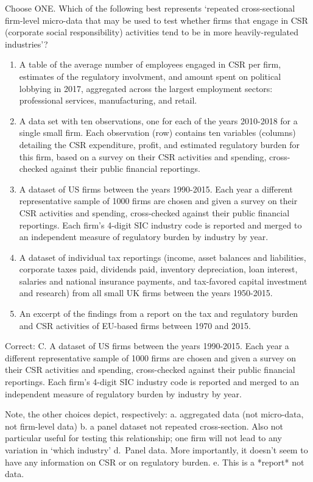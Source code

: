 \documentclass[]{article}
\begin{document}
Choose ONE. Which of the following best represents `repeated
cross-sectional firm-level micro-data that may be used to test whether
firms that engage in CSR (corporate social responsibility) activities
tend to be in more heavily-regulated industries'?

\begin{enumerate}
\def\labelenumi{\Alph{enumi}.}
\item
  A table of the average number of employees engaged in CSR per firm,
  estimates of the regulatory involvment, and amount spent on political
  lobbying in 2017, aggregated across the largest employment sectors:
  professional services, manufacturing, and retail.
\item
  A data set with ten observations, one for each of the years 2010-2018
  for a single small firm. Each observation (row) contains ten variables
  (columns) detailing the CSR expenditure, profit, and estimated
  regulatory burden for this firm, based on a survey on their CSR
  activities and spending, cross-checked against their public financial
  reportings.
\item
  A dataset of US firms between the years 1990-2015. Each year a
  different representative sample of 1000 firms are chosen and given a
  survey on their CSR activities and spending, cross-checked against
  their public financial reportings. Each firm's 4-digit SIC industry
  code is reported and merged to an independent measure of regulatory
  burden by industry by year.
\item
  A dataset of individual tax reportings (income, asset balances and
  liabilities, corporate taxes paid, dividends paid, inventory
  depreciation, loan interest, salaries and national insurance payments,
  and tax-favored capital investment and research) from all small UK
  firms between the years 1950-2015.
\item
  An excerpt of the findings from a report on the tax and regulatory
  burden and CSR activities of EU-based firms between 1970 and 2015.
\end{enumerate}

Correct: C. A dataset of US firms between the years 1990-2015. Each year
a different representative sample of 1000 firms are chosen and given a
survey on their CSR activities and spending, cross-checked against their
public financial reportings. Each firm's 4-digit SIC industry code is
reported and merged to an independent measure of regulatory burden by
industry by year.

Note, the other choices depict, respectively: a. aggregated data (not
micro-data, not firm-level data) b. a panel dataset not repeated
cross-section. Also not particular useful for testing this relationship;
one firm will not lead to any variation in `which industry' d.~Panel
data. More importantly, it doesn't seem to have any information on CSR
or on regulatory burden. e. This is a *report* not data.
\end{document}
